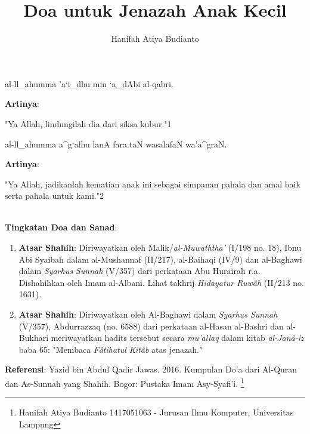 \documentclass[a4paper,12pt]{article}
\title{\Large Doa untuk Jenazah Anak Kecil}
\author{\calligra Hanifah Atiya Budianto}
\begin{document}
\sffamily
\maketitle 
\fullvocalize
{}
\begin{arabtext}
\noindent
al-ll_ahumma 'a`i_dhu min `a_dAbi al-qabri.\\
\end{arabtext}
\noindent
\textbf{Artinya}:
\par
\indent
"Ya Allah, lindungilah dia dari siksa kubur."{\scriptsize 1}\\
\begin{arabtext}
\noindent
al-ll_ahumma a^g`alhu lanA fara.taN wasalafaN wa'a^graN.\\
\end{arabtext}
\noindent
\textbf{Artinya}:
\par
\indent
"Ya Allah, jadikanlah kematian anak ini sebagai simpanan pahala dan amal 
baik serta pahala untuk kami."{\scriptsize 2}\\\\
\par
\noindent
\textbf{Tingkatan Doa dan Sanad}:
\begin{enumerate}
\item \textbf{Atsar Shahih}: Diriwayatkan oleh Malik/\textit{al-Muwaththa'}
(I/198 no. 18), Ibnu Abi Syaibah dalam al-Mushannaf (II/217), al-Baihaqi 
(IV/9) dan al-Baghawi dalam \textit{Syarhus Sunnah} (V/357) dari perkataan 
Abu Hurairah r.a. Dishahihkan oleh Imam al-Albani. Lihat takhrij 
\textit{Hidayatur Ruw\^{a}h} (II/213 no. 1631).
\item \textbf{Atsar Shahih}: Diriwayatkan oleh Al-Baghawi dalam 
\textit{Syarhus Sunnah} (V/357), Abdurrazzaq (no. 6588) dari perkataan 
al-Hasan al-Bashri dan al-Bukhari meriwayatkan hadits tersebut secara 
\textit{mu'allaq} dalam kitab \textit{al-Jan\^{a}-iz} baba 65: "Membaca 
\textit{F\^{a}tihatul Kit\^{a}b} atas jenazah."
\end{enumerate}
\textbf{Referensi}: Yazid bin Abdul Qadir Jawas. 2016. Kumpulan Do'a dari
Al-Quran dan As-Sunnah yang Shahih. Bogor: Pustaka Imam Asy-Syafi'i.
\footnote{Hanifah Atiya Budianto 1417051063 - Jurusan Ilmu Komputer,
Universitas Lampung}
\end{document}
